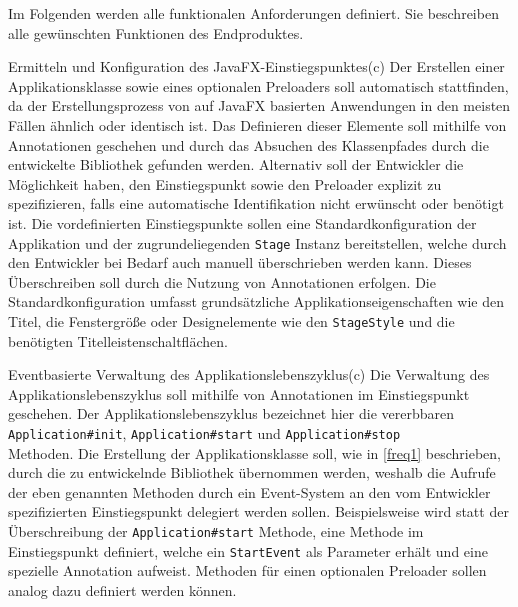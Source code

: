 Im Folgenden werden alle funktionalen Anforderungen definiert. Sie beschreiben alle gewünschten Funktionen des Endproduktes.
\begin{freq}{Ermitteln und Konfiguration des JavaFX-Einstiegspunktes}(c)
	Der Erstellen einer Applikationsklasse sowie eines optionalen Preloaders soll automatisch stattfinden, da der Erstellungsprozess von auf JavaFX basierten Anwendungen in den meisten Fällen ähnlich oder identisch ist. Das Definieren dieser Elemente soll mithilfe von Annotationen geschehen und durch das Absuchen des Klassenpfades durch die entwickelte Bibliothek gefunden werden. Alternativ soll der Entwickler die Möglichkeit haben, den Einstiegspunkt sowie den Preloader explizit zu spezifizieren, falls eine automatische Identifikation nicht erwünscht oder benötigt ist. Die vordefinierten Einstiegspunkte sollen eine Standardkonfiguration der Applikation und der zugrundeliegenden \texttt{Stage} Instanz bereitstellen, welche durch den Entwickler bei Bedarf auch manuell überschrieben werden kann. Dieses Überschreiben soll durch die Nutzung von Annotationen erfolgen. Die Standardkonfiguration umfasst grundsätzliche Applikationseigenschaften wie den Titel, die Fenstergröße oder Designelemente wie den \texttt{StageStyle} und die benötigten Titelleistenschaltflächen.
\end{freq}
\begin{freq}{Eventbasierte Verwaltung des Applikationslebenszyklus}(c)
	Die Verwaltung des Applikationslebenszyklus soll mithilfe von Annotationen im Einstiegspunkt geschehen. Der Applikationslebenszyklus bezeichnet hier die vererbbaren \texttt{Application\#init}, \texttt{Application\#start} und \texttt{Application\#stop}\\ Methoden. Die Erstellung der Applikationsklasse soll, wie in \autoref{freq1} beschrieben, durch die zu entwickelnde Bibliothek übernommen werden, weshalb die Aufrufe der eben genannten Methoden durch ein Event-System an den vom Entwickler spezifizierten Einstiegspunkt delegiert werden sollen. Beispielsweise wird statt der Überschreibung der \texttt{Application\#start} Methode, eine Methode im Einstiegspunkt definiert, welche ein \texttt{StartEvent} als Parameter erhält und eine spezielle Annotation aufweist. Methoden für einen optionalen Preloader sollen analog dazu definiert werden können.
\end{freq}
